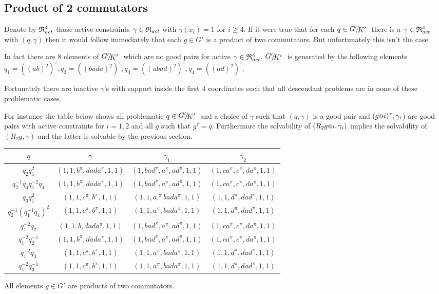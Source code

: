 \documentclass[a4paper,12pt]{article}
\begin{document}
\subsection{Product of 2 commutators}
Denote by $\mathfrak{R}_{act}^4$ those active constraints $\gamma\in\mathfrak{R}_{act}$ with $\gamma(x_i)=1$ for $i\geq 4$.
If it were true that for each $q\in\RNK{G'}{K'}$ there is a $\gamma\in\mathfrak{R}_{act}^4$ with $(q,\gamma)$ 
then it would follow immediately that each $g\in G'$ is a product of two commutators. But unfortunately 
this isn't the case.

In fact there are $8$ elements of $\RNK{G'}{K'}$ which are no good pairs for active $\gamma\in\mathfrak{R}_{act}^4$.
$\RNK{G'}{K'}$ is generated by the following elements $q_1 = ((ab)^2)^\tau,q_2 = ((bada)^2)^\tau,q_3 = ((abad)^2)^\tau,q_4 = ((ad)^2)^\tau$. 

Fortunately there are inactive $\gamma$'s with support inside the first 4 coordinates such that 
all descendant problems are in none of these problematic cases. 

For instance the table below shows 
all problematic $q\in \RNK{G'}{K'}$ and a choice of $\gamma$ such that $(q,\gamma)$ is a good pair
and $(g\at{i})^\tau,\gamma_i$) are good pairs with active constraints for $i=1,2$ and all $g$ such that $g^\tau = q$. 
Furthermore the solvability of $(R_2g\at{i},\gamma_i)$ implies the solvability of $(R_2g,\gamma)$ and the latter is solvable by 
the previous section.

\begin{tabular}{cccc}
$q$ & $\gamma$ & $\gamma_1$ & $\gamma_2$\\ \hline
$q_2q_1^2 $& $ ( 1, 1, b^\pi, dada^\pi, 1, 1 ) $ & $ ( 1, bad^\pi, a^\pi, ad^\pi, 1,  1 ) $ & $ ( 1, ca^\pi, c^\pi, da^\pi, 1, 1 )$\\
$q_2^{-1}q_4q_1^{-2}q_4$& $ ( 1, 1, b^\pi, dada^\pi, 1, 1 ) $ & $ ( 1, bad^\pi, a^\pi, ad^\pi, 1,  1 ) $ & $ ( 1, ca^\pi, c^\pi, da^\pi, 1, 1 )$\\
$q_3q_1^2 $			& $ ( 1, 1, c^\pi, b^\pi, 1, 1 ) $ & $ ( 1, 1, a,^\pi bada^\pi, 1, 1 ) $ & $ ( 1, 1, d^\pi, dad^\pi, 1, 1 )$\\
$q_2^{-1}(q_1^{-1}q_4)^2$ 	 & $ ( 1, 1, c^\pi, b^\pi, 1, 1 ) $ & $ ( 1, 1, a^\pi, bada^\pi, 1,   1 ) $ & $ ( 1, 1, d^\pi, dad^\pi, 1, 1 )$\\
$q_1^{-2}q_2$		 & $ ( 1, 1, b, dada^\pi, 1, 1 ) $ & $ ( 1, bad^\pi, a^\pi, ad^\pi, 1,  1 ) $ & $ ( 1, ca^\pi, c^\pi, da^\pi, 1, 1 )$\\
$q_1^{-2}q_2^{-1}$		 & $ ( 1, 1, b^\pi, dada^\pi, 1, 1 ) $ & $ ( 1, bad^\pi, a^\pi, ad^\pi, 1,  1 ) $ & $ ( 1, ca^\pi, c^\pi, da^\pi, 1, 1 )$\\
$q_1^{-2}q_3$		 & $ ( 1, 1, c^\pi, b^\pi, 1, 1 ) $ & $ ( 1, 1, a^\pi, bada^\pi, 1,  1 ) $ & $ ( 1, 1, d^\pi, dad^\pi, 1, 1 )$\\
$q_1^{-2}q_3^{-1}$		 & $ ( 1, 1, c^\pi, b^\pi, 1, 1 ) $ & $ ( 1, 1, a^\pi, bada^\pi, 1,  1 ) $ & $ ( 1, 1, d^\pi, dad^\pi, 1, 1 )$
\end{tabular}
\begin{cor}
 All elements $g\in G'$ are products of two commutators.
\end{cor}


{}

\appendix
% 
%
\end{document}

